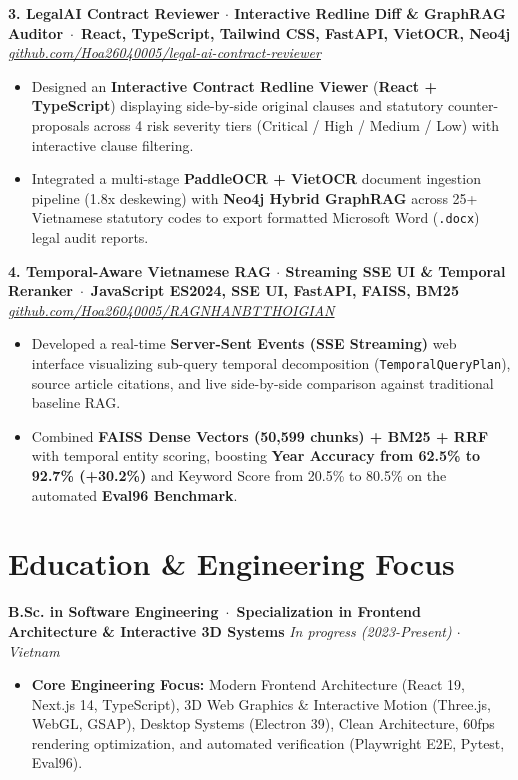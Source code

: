 \documentclass[10pt,a4paper]{article}
\newcommand{\resumeProject}[3]{
  \vspace{2pt}
  \noindent\textbf{#1} \,$\cdot$\, {\footnotesize\textbf{\color{accent}#2}} \hfill {\footnotesize\textit{#3}} \\
}
\begin{document}
\resumeProject{3. LegalAI Contract Reviewer $\cdot$ Interactive Redline Diff \& GraphRAG Auditor}{React, TypeScript, Tailwind CSS, FastAPI, VietOCR, Neo4j}{\href{https://github.com/Hoa26040005/legal-ai-contract-reviewer}{github.com/Hoa26040005/legal-ai-contract-reviewer}}
{\footnotesize
\begin{itemize}
  \item Designed an \textbf{Interactive Contract Redline Viewer} (\textbf{React + TypeScript}) displaying side-by-side original clauses and statutory counter-proposals across 4 risk severity tiers (Critical / High / Medium / Low) with interactive clause filtering.
  \item Integrated a multi-stage \textbf{PaddleOCR + VietOCR} document ingestion pipeline (1.8x deskewing) with \textbf{Neo4j Hybrid GraphRAG} across 25+ Vietnamese statutory codes to export formatted Microsoft Word (\texttt{.docx}) legal audit reports.
\end{itemize}
}

\resumeProject{4. Temporal-Aware Vietnamese RAG $\cdot$ Streaming SSE UI \& Temporal Reranker}{JavaScript ES2024, SSE UI, FastAPI, FAISS, BM25}{\href{https://github.com/Hoa26040005/RAGNHANBTTHOIGIAN}{github.com/Hoa26040005/RAGNHANBTTHOIGIAN}}
{\footnotesize
\begin{itemize}
  \item Developed a real-time \textbf{Server-Sent Events (SSE Streaming)} web interface visualizing sub-query temporal decomposition (\texttt{TemporalQueryPlan}), source article citations, and live side-by-side comparison against traditional baseline RAG.
  \item Combined \textbf{FAISS Dense Vectors (50,599 chunks) + BM25 + RRF} with temporal entity scoring, boosting \textbf{Year Accuracy from 62.5\% to 92.7\% (+30.2\%)} and Keyword Score from 20.5\% to 80.5\% on the automated \textbf{Eval96 Benchmark}.
\end{itemize}
}

\section{Education \& Engineering Focus}
\resumeProject{B.Sc. in Software Engineering}{Specialization in Frontend Architecture \& Interactive 3D Systems}{In progress (2023-Present) $\cdot$ Vietnam}
{\footnotesize
\begin{itemize}
  \item \textbf{Core Engineering Focus:} Modern Frontend Architecture (React 19, Next.js 14, TypeScript), 3D Web Graphics \& Interactive Motion (Three.js, WebGL, GSAP), Desktop Systems (Electron 39), Clean Architecture, 60fps rendering optimization, and automated verification (Playwright E2E, Pytest, Eval96).
\end{itemize}
}
\end{document}
